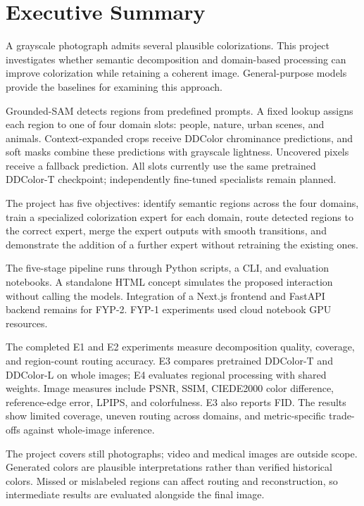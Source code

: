 \documentclass{FastFyp}
\begin{document}
\section*{Executive Summary}

A grayscale photograph admits several plausible colorizations. This project investigates whether semantic decomposition and domain-based processing can improve colorization while retaining a coherent image. General-purpose models provide the baselines for examining this approach.

Grounded-SAM detects regions from predefined prompts. A fixed lookup assigns each region to one of four domain slots: people, nature, urban scenes, and animals. Context-expanded crops receive DDColor chrominance predictions, and soft masks combine these predictions with grayscale lightness. Uncovered pixels receive a fallback prediction. All slots currently use the same pretrained DDColor-T checkpoint; independently fine-tuned specialists remain planned.

The project has five objectives: identify semantic regions across the four domains, train a specialized colorization expert for each domain, route detected regions to the correct expert, merge the expert outputs with smooth transitions, and demonstrate the addition of a further expert without retraining the existing ones.

The five-stage pipeline runs through Python scripts, a CLI, and evaluation notebooks. A standalone HTML concept simulates the proposed interaction without calling the models. Integration of a Next.js frontend and FastAPI backend remains for FYP-2. FYP-1 experiments used cloud notebook GPU resources.

The completed E1 and E2 experiments measure decomposition quality, coverage, and region-count routing accuracy. E3 compares pretrained DDColor-T and DDColor-L on whole images; E4 evaluates regional processing with shared weights. Image measures include PSNR, SSIM, CIEDE2000 color difference, reference-edge error, LPIPS, and colorfulness. E3 also reports FID. The results show limited coverage, uneven routing across domains, and metric-specific trade-offs against whole-image inference.

The project covers still photographs; video and medical images are outside scope. Generated colors are plausible interpretations rather than verified historical colors. Missed or mislabeled regions can affect routing and reconstruction, so intermediate results are evaluated alongside the final image.
\end{document}
